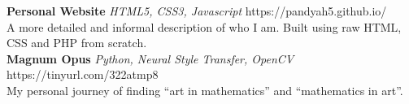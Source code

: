 \documentclass[a4paper]{article}
\begin{document}
{\textbf{Personal Website}} {\sl HTML5, CSS3, Javascript} \hfill https://pandyah5.github.io/\\
A more detailed and informal description of who I am. Built using raw HTML, CSS and PHP from scratch.\\
\vspace*{1mm}
{\textbf{Magnum Opus}} {\sl Python, Neural Style Transfer, OpenCV} \hfill https://tinyurl.com/322atmp8\\
My personal journey of finding “art in mathematics” and “mathematics in art”.\\
\vspace*{2mm}
\end{document}
